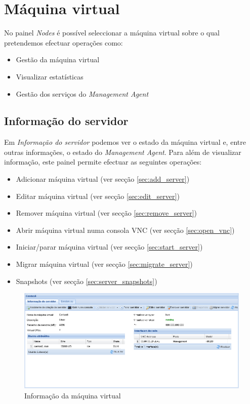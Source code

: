 \pagebreak

\section{Máquina virtual}
\label{sec:server}

No painel \emph{Nodes} é possível seleccionar a máquina virtual sobre o qual pretendemos efectuar operações como:

\begin{itemize}
        \item Gestão da máquina virtual
        \item Visualizar estatísticas        
        \item Gestão dos serviços do \emph{Management Agent}
\end{itemize}

\subsection{Informação do servidor}
Em \emph{Informação do servidor} podemos ver o estado da máquina virtual e, entre outras informações, o estado do \emph{Management Agent}.
Para além de visualizar informação, este painel permite efectuar as seguintes operações:
\begin{itemize}
	\item Adicionar máquina virtual (ver secção \ref{sec:add_server})
    \item Editar máquina virtual (ver secção \ref{sec:edit_server})
	\item Remover máquina virtual (ver secção \ref{sec:remove_server})
	\item Abrir máquina virtual numa consola VNC (ver secção \ref{sec:open_vnc})
	\item Iniciar/parar máquina virtual (ver secção \ref{sec:start_server})
    \item Migrar máquina virtual (ver secção \ref{sec:migrate_server})
    \item Snapshots (ver secção \ref{sec:server_snapshots})
\end{itemize}

\begin{figure}[H]
	\begin{center}
	\includegraphics[scale=0.45]{screenshots/server_info.png}
	\caption{Informação da máquina virtual}
	\label{fig:server_info}
	\end{center}
\end{figure}

